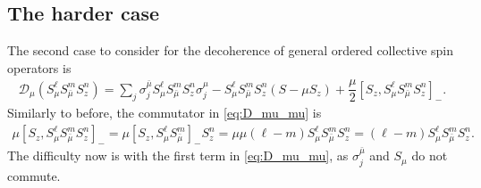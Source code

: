 \documentclass[aps,notitlepage,nofootinbib,11pt]{revtex4-1}
\newcommand{\f}[2]{\dfrac{#1}{#2}} %
\newcommand{\p}[1]{\left(#1\right)} %
\renewcommand{\sp}[1]{\left[#1\right]} %
\newcommand{\D}{\mathcal{D}}
\newcommand{\bmu}{{\bar\mu}}
\newcommand{\1}{\mathds{1}}
\begin{document}
\subsection{The harder case}

The second case to consider for the decoherence of general ordered
collective spin operators is
\begin{align}
  \D_\mu\p{S_\mu^\ell S_\bmu^m S_z^n}
  = \sum_j \sigma_j^\bmu S_\mu^\ell S_\bmu^m S_z^n \sigma_j^\mu
  - S_\mu^\ell S_\bmu^m S_z^n \p{S - \mu S_z}
  + \f{\mu}{2} \sp{S_z, S_\mu^\ell S_\bmu^m S_z^n}_-.
  \label{eq:D_mu_mu}
\end{align}
Similarly to before, the commutator in \eqref{eq:D_mu_mu} is
\begin{align}
  \mu \sp{S_z, S_\mu^\ell S_\bmu^m S_z^n}_-
  = \mu \sp{S_z, S_\mu^\ell S_\bmu^m}_- S_z^n
  = \mu\mu \p{\ell-m} S_\mu^\ell S_\bmu^m S_z^n
  = \p{\ell-m} S_\mu^\ell S_\bmu^m S_z^n.
\end{align}
The difficulty now is with the first term in \eqref{eq:D_mu_mu}, as
$\sigma_j^\bmu$ and $S_\mu$ do not commute.
\end{document}
